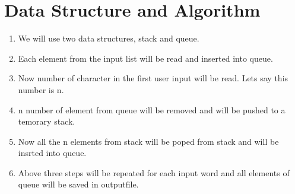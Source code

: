 \documentclass[a4paper,10pt]{report} %
\begin{document}
\section{Data Structure and Algorithm}
\begin{enumerate}
 \item We will use two data structures, stack and queue.
\item  Each element from the input list will be read and inserted into queue.
\item Now number of character in the first user input will be read. Lets say this number is n.
\item n number of element from queue will be removed and will be pushed to a temorary stack.
\item Now all the n elements from stack will be poped from stack and will be insrted into queue.
\item Above three steps will be repeated for each input word and all elements of queue will be saved in outputfile.
\end{enumerate}
\end{document}
